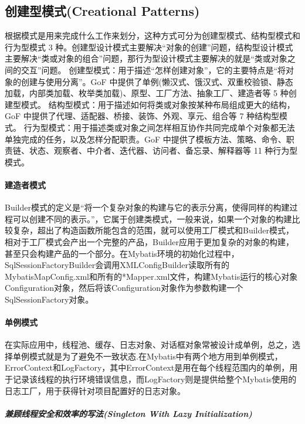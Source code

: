 \documentclass[../../../interview-questions.tex]{subfiles}
\begin{document}
\subsection{创建型模式(Creational Patterns)}

根据模式是用来完成什么工作来划分，这种方式可分为创建型模式、结构型模式和行为型模式 3 种。创建型设计模式主要解决“对象的创建”问题，结构型设计模式主要解决“类或对象的组合”问题，那行为型设计模式主要解决的就是“类或对象之间的交互”问题。
创建型模式：用于描述“怎样创建对象”，它的主要特点是“将对象的创建与使用分离”。GoF 中提供了单例(懒汉式、饿汉式、双重校验锁、静态加载，内部类加载、枚举类加载)、原型、工厂方法、抽象工厂、建造者等 5 种创建型模式。
结构型模式：用于描述如何将类或对象按某种布局组成更大的结构，GoF 中提供了代理、适配器、桥接、装饰、外观、享元、组合等 7 种结构型模式。
行为型模式：用于描述类或对象之间怎样相互协作共同完成单个对象都无法单独完成的任务，以及怎样分配职责。GoF 中提供了模板方法、策略、命令、职责链、状态、观察者、中介者、迭代器、访问者、备忘录、解释器等 11 种行为型模式。


\paragraph{建造者模式}

Builder模式的定义是“将一个复杂对象的构建与它的表示分离，使得同样的构建过程可以创建不同的表示。”，它属于创建类模式，一般来说，如果一个对象的构建比较复杂，超出了构造函数所能包含的范围，就可以使用工厂模式和Builder模式，相对于工厂模式会产出一个完整的产品，Builder应用于更加复杂的对象的构建，甚至只会构建产品的一个部分。在Mybatis环境的初始化过程中，SqlSessionFactoryBuilder会调用XMLConfigBuilder读取所有的MybatisMapConfig.xml和所有的*Mapper.xml文件，构建Mybatis运行的核心对象Configuration对象，然后将该Configuration对象作为参数构建一个SqlSessionFactory对象。

\paragraph{单例模式}

在实际应用中，线程池、缓存、日志对象、对话框对象常被设计成单例，总之，选择单例模式就是为了避免不一致状态.在Mybatis中有两个地方用到单例模式，ErrorContext和LogFactory，其中ErrorContext是用在每个线程范围内的单例，用于记录该线程的执行环境错误信息，而LogFactory则是提供给整个Mybatis使用的日志工厂，用于获得针对项目配置好的日志对象。

\subparagraph{兼顾线程安全和效率的写法(Singleton With Lazy Initialization)}
\end{document}
